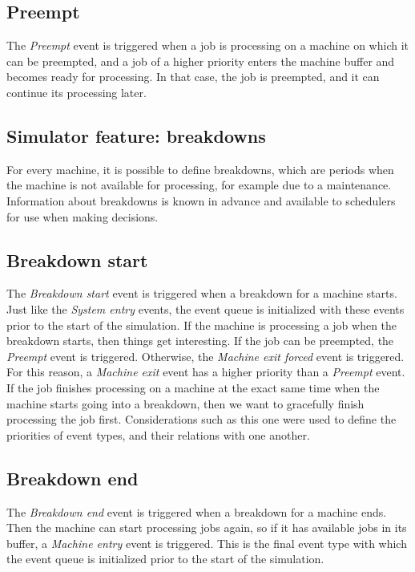 \subsection{Preempt}
The \textit{Preempt} event is triggered when a job is processing on a machine on which it can be preempted, and a job of a higher priority enters the machine buffer and becomes ready for processing. In that case, the job is preempted, and it can continue its processing later.

\subsection{Simulator feature: breakdowns}
For every machine, it is possible to define breakdowns, which are periods when the machine is not available for processing, for example due to a maintenance. Information about breakdowns is known in advance and available to schedulers for use when making decisions.

\subsection{Breakdown start}
The \textit{Breakdown start} event is triggered when a breakdown for a machine starts. Just like the \textit{System entry} events, the event queue is initialized with these events prior to the start of the simulation. If the machine is processing a job when the breakdown starts, then things get interesting. If the job can be preempted, the \textit{Preempt} event is triggered. Otherwise, the \textit{Machine exit forced} event is triggered. For this reason, a \textit{Machine exit} event has a higher priority than a \textit{Preempt} event. If the job finishes processing on a machine at the exact same time when the machine starts going into a breakdown, then we want to gracefully finish processing the job first. Considerations such as this one were used to define the priorities of event types, and their relations with one another.

\subsection{Breakdown end}
The \textit{Breakdown end} event is triggered when a breakdown for a machine ends. Then the machine can start processing jobs again, so if it has available jobs in its buffer, a \textit{Machine entry} event is triggered. This is the final event type with which the event queue is initialized prior to the start of the simulation.

